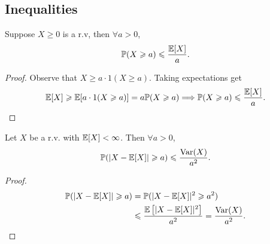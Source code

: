 \subsection{Inequalities}
\begin{proposition}\label{prop:Markov's inequality}
    Suppose $ X\ge 0 $ is a r.v, then $ \forall a>0 $, 
    \[
        \mathbb{P}(X\geqslant a) \leqslant \frac{{\mathbb{E}}[X]}{a}.
    \]
\end{proposition}
\begin{proof}
    Observe that $ X\ge a \cdot 1(X\ge a) $. Taking expectations get 
    \[
        {\mathbb{E}}[X]\geqslant {\mathbb{E}}[a \cdot 1(X\geqslant a)] = a \mathbb{P}(X\geqslant a) \Longrightarrow \mathbb{P}(X\geqslant a)\leqslant \frac{{\mathbb{E}}[X]}{a}.\qedhere
    \]
\end{proof}
\begin{proposition}\label{prop:Chebyshev's inequality}
    Let $X$ be a r.v. with $ {\mathbb{E}}[X]<\infty  $. Then $ \forall a>0 $,
    \[
        \mathbb{P}(|X-{\mathbb{E}}[X]|\geqslant a)\leqslant \frac{\operatorname{Var}(X)}{a^2}.
    \]
\end{proposition}
\begin{proof}
    \begin{align*}
        \mathbb{P}(|X-{\mathbb{E}}[X]|\geqslant a) &= \mathbb{P}(|X-{\mathbb{E}}[X]|^2\geqslant a^2)\\ 
        &\leqslant \frac{{\mathbb{E}}\left[ |X-{\mathbb{E}}[X]|^2 \right]}{a^2} = \frac{\operatorname{Var}(X)}{a^2}.\qedhere
    \end{align*}
\end{proof}

